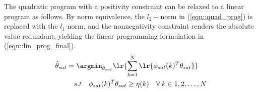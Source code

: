 The quadratic program with a positivity constraint can be relaxed to a linear program as follows. By norm equivalence,
the $l_2-$norm in (\ref{eqn::quad_prog}) is replaced with the $l_1$-norm, and the nonnegativity constraint renders the
absolute value redundant, yielding the linear programming formulation in (\ref{eqn::lin_prog_final}).
\begin{align}
        \hat \theta_{sat}
        &= \argmin_{\theta_{sat}} \lr{\sum_{k=1}^N \lr{\phi_{sat}(k)^T \theta_{sat}}} \notag\\
        &\quad  s.t \quad \phi_{sat}(k)^T \theta_{sat} \geq \eta(k) \quad \forall \: k \in {1,2, \hdots, N}
        \label{eqn::lin_prog_final}
\end{align}
